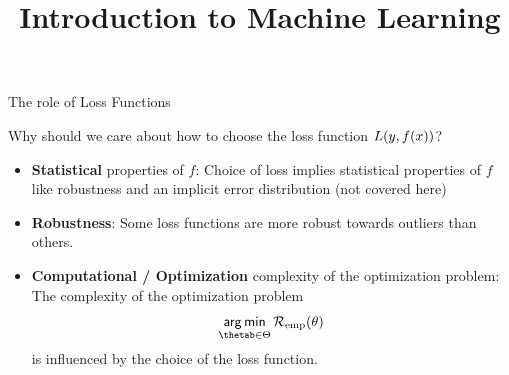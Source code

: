 




\newcommand{\titlefigure}{figure_man/optimization_steps.jpeg}
\newcommand{\learninggoals}{
  \item Learn about robust loss functions
  \item Learn about analytical properties important for optimization 
}

\title{Introduction to Machine Learning}
\date{}






\begin{vbframe}{The role of Loss Functions}

Why should we care about how to choose the loss function $L(y, f(x))$?

\begin{itemize}
\item \textbf{Statistical} properties of $f$: Choice of loss implies statistical properties of $f$ like robustness and an implicit error distribution (not covered here)
\item \textbf{Robustness}: Some loss functions are more robust towards outliers than others. 
\item \textbf{Computational / Optimization} complexity of the optimization problem: The complexity of the optimization problem
$$
\argmin_{\thetab \in \Theta} \risket
$$
is influenced by the choice of the loss function. 
\end{itemize}


\end{vbframe}





